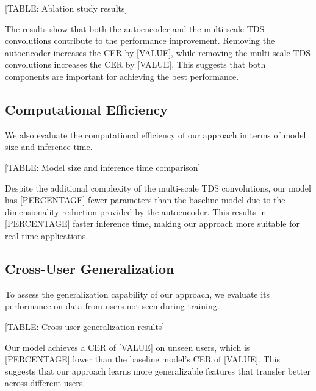 [TABLE: Ablation study results]

The results show that both the autoencoder and the multi-scale TDS convolutions contribute to the performance improvement. Removing the autoencoder increases the CER by [VALUE], while removing the multi-scale TDS convolutions increases the CER by [VALUE]. This suggests that both components are important for achieving the best performance.

\subsection{Computational Efficiency}

We also evaluate the computational efficiency of our approach in terms of model size and inference time.

[TABLE: Model size and inference time comparison]

Despite the additional complexity of the multi-scale TDS convolutions, our model has [PERCENTAGE] fewer parameters than the baseline model due to the dimensionality reduction provided by the autoencoder. This results in [PERCENTAGE] faster inference time, making our approach more suitable for real-time applications.

\subsection{Cross-User Generalization}

To assess the generalization capability of our approach, we evaluate its performance on data from users not seen during training.

[TABLE: Cross-user generalization results]

Our model achieves a CER of [VALUE] on unseen users, which is [PERCENTAGE] lower than the baseline model's CER of [VALUE]. This suggests that our approach learns more generalizable features that transfer better across different users. 